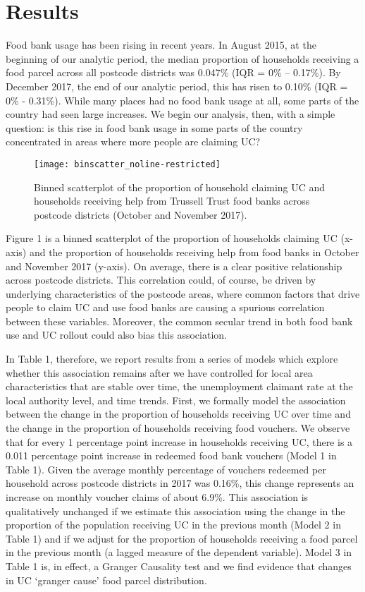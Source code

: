 \documentclass[12pt,article,oneside]{memoir}
\begin{document}
\section*{Results}

Food bank usage has been rising in recent years. In August 2015, at the beginning of our analytic period, the median proportion of households receiving a food parcel across all postcode districts was 0.047\% (IQR = 0\% – 0.17\%). By December 2017, the end of our analytic period, this has risen to 0.10\% (IQR = 0\% - 0.31\%). While many places had no food bank usage at all, some parts of the country had seen large increases. We begin our analysis, then, with a simple question: is this rise in food bank usage in some parts of the country concentrated in areas where more people are claiming UC?  


\begin{figure}
\caption{Binned scatterplot of the proportion of household claiming UC and households receiving help from Trussell Trust food banks across postcode districts (October and November 2017).}
\begin{center}
\texttt{[image: binscatter\_noline-restricted]}
\end{center}

\end{figure}	

Figure 1 is a binned scatterplot of the proportion of households claiming UC (x-axis) and the proportion of households receiving help from food banks in October and November 2017 (y-axis). On average, there is a clear positive relationship across postcode districts. This correlation could, of course, be driven by underlying characteristics of the postcode areas, where common factors that drive people to claim UC and use food banks are causing a spurious correlation between these variables. Moreover, the common secular trend in both food bank use and UC rollout could also bias this association. 

In Table 1, therefore, we report results from a series of models which explore whether this association remains after we have controlled for local area characteristics that are stable over time, the unemployment claimant rate at the local authority level, and time trends. First, we formally model the association between the change in the proportion of households receiving UC over time and the change in the proportion of households receiving food vouchers. We observe that for every 1 percentage point increase in households receiving UC, there is a 0.011 percentage point increase in redeemed food bank vouchers (Model 1 in Table 1). Given the average monthly percentage of vouchers redeemed per household across postcode districts in 2017 was 0.16\%, this change represents an increase on monthly voucher claims of about 6.9\%. This association is qualitatively unchanged if we estimate this association using the change in the proportion of the population receiving UC in the previous month (Model 2 in Table 1) and if we adjust for the proportion of households receiving a food parcel in the previous month (a lagged measure of the dependent variable). Model 3 in Table 1 is, in effect, a Granger Causality test and we find evidence that changes in UC `granger cause' food parcel distribution.
\end{document}
